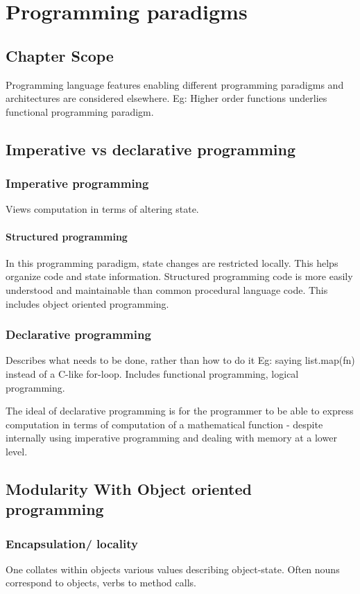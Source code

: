 \documentclass[oneside, article]{memoir}
\begin{document}
\chapter{Programming paradigms}
\section{Chapter Scope}
Programming language features enabling different programming paradigms and architectures are considered elsewhere. Eg: Higher order functions underlies functional programming paradigm.

\section{Imperative vs declarative programming}
\subsection{Imperative programming}
Views computation in terms of altering state.

\subsubsection{Structured programming}
In this programming paradigm, state changes are restricted locally. This helps organize code and state information. Structured programming code is more easily understood and maintainable than common procedural language code. This includes object oriented programming.

\subsection{Declarative programming}
Describes what needs to be done, rather than how to do it Eg: saying list.map(fn) instead of a C-like for-loop. Includes functional programming, logical programming.

The ideal of declarative programming is for the programmer to be able to express computation in terms of computation of a mathematical function - despite internally using imperative programming and dealing with memory at a lower level.


\section{Modularity With Object oriented programming}
\subsection{Encapsulation/ locality}
One collates within objects various values describing object-state. Often nouns correspond to objects, verbs to method calls.
\end{document}
